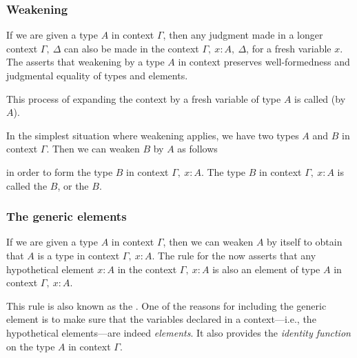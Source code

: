 \subsubsection*{Weakening}
If we are given a type $A$ in context $\Gamma$, then any judgment made in a longer context $\Gamma,~\Delta$ can also be made in the context $\Gamma,~x:A,~\Delta$, for a fresh variable $x$. The  asserts that weakening by a type $A$ in context preserves well-formedness and judgmental equality of types and elements.
\begin{prooftree}
\end{prooftree}
This process of expanding the context by a fresh variable of type $A$ is called  (by $A$).

In the simplest situation where weakening applies, we have two types $A$ and $B$ in context $\Gamma$. Then we can weaken $B$ by $A$ as follows
\begin{prooftree}
\end{prooftree}
in order to form the type $B$ in context $\Gamma,~x:A$. The type $B$ in context $\Gamma,~x:A$ is called the  $B$, or the  $B$.

\subsubsection*{The generic elements}
If we are given a type $A$ in context $\Gamma$, then we can weaken $A$ by itself to obtain that $A$ is a type in context $\Gamma,~x:A$. The rule for the  now asserts that any hypothetical element $x:A$ in the context $\Gamma,~x:A$ is also an element of type $A$ in context $\Gamma,~x:A$.
\begin{prooftree}
\end{prooftree}
This rule is also known as the . One of the reasons for including the generic element is to make sure that the variables declared in a context---i.e., the hypothetical elements---are indeed \emph{elements}. It also provides the \emph{identity function} on the type $A$ in context $\Gamma$.

